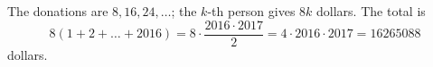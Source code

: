 The donations are $8,16,24,\dots$; the $k$-th person gives $8k$ dollars. The total is
\[
8(1+2+\dots+2016)=8\cdot\dfrac{2016\cdot2017}{2}=4\cdot2016\cdot2017=\boxed{16265088}
\]
dollars.

